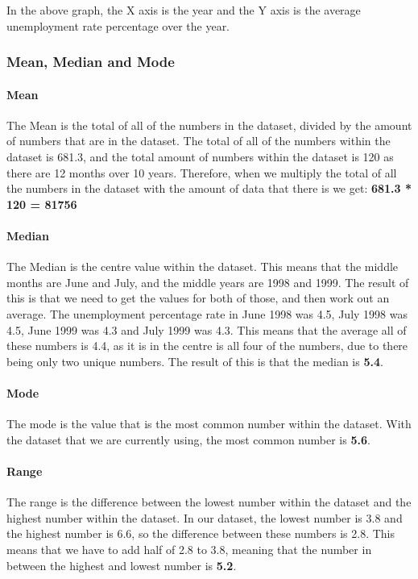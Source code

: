 \documentclass[a4paper,12pt]{article}
\begin{document}
  In the above graph, the X axis is the year and the Y axis is the average unemployment rate percentage over the year.

  \subsubsection{Mean, Median and Mode}
    \paragraph{Mean}
      The Mean is the total of all of the numbers in the dataset, divided by the amount of numbers that are in the dataset. The total of all of the numbers within the dataset is 681.3, and the total amount of numbers within the dataset is 120 as there are 12 months over 10 years. Therefore, when we multiply the total of all the numbers in the dataset with the amount of data that there is we get:
      \textbf{681.3 * 120 = 81756}

      \paragraph{Median}
        The Median is the centre value within the dataset. This means that the middle months are June and July, and the middle years are 1998 and 1999. The result of this is that we need to get the values for both of those, and then work out an average. The unemployment percentage rate in June 1998 was 4.5, July 1998 was 4.5, June 1999 was 4.3 and July 1999 was 4.3. This means that the average all of these numbers is 4.4, as it is in the centre is all four of the numbers, due to there being only two unique numbers. The result of this is that the median is \textbf{5.4}.

      \paragraph{Mode}
        The mode is the value that is the most common number within the dataset. With the dataset that we are currently using, the most common number is \textbf{5.6}.

      \paragraph{Range}
        The range is the difference between the lowest number within the dataset and the highest number within the dataset. In our dataset, the lowest number is 3.8 and the highest number is 6.6, so the difference between these numbers is 2.8. This means that we have to add half of 2.8 to 3.8, meaning that the number in between the highest and lowest number is \textbf{5.2}.
\end{document}

